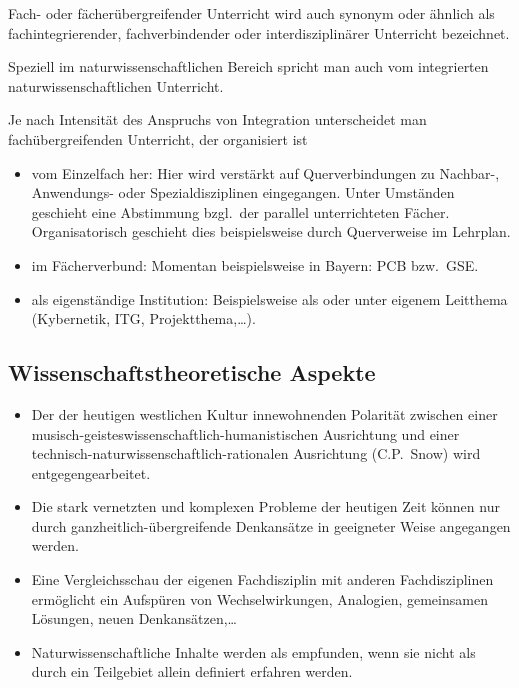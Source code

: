 Fach- oder f\"{a}cher\"{u}bergreifender Unterricht wird auch synonym
oder \"{a}hnlich als fachintegrierender, fachverbindender oder
interdisziplin\"{a}rer Unterricht bezeichnet.

\mip
Speziell im naturwissenschaftlichen Bereich spricht man auch vom
integrierten naturwissenschaftlichen Unterricht.

Je nach Intensit\"{a}t des Anspruchs von Integration unterscheidet man
fach\"{u}bergreifenden Unterricht, der organisiert ist
\begin{itemize}
\setlength{\itemsep}{0mm}
\item
vom Einzelfach her:
Hier wird verst\"{a}rkt auf Querverbindungen zu Nachbar-,
Anwendungs- oder Spezialdisziplinen eingegangen.
Unter Umst\"{a}nden geschieht eine Abstimmung
bzgl.\ der parallel unterrichteten F\"{a}cher.
Organisatorisch geschieht dies beispielsweise durch
Querverweise im Lehrplan.
\item
im F\"{a}cherverbund: Momentan beispielsweise in Bayern: PCB bzw.\ GSE.
\item
als eigenst\"{a}ndige Institution:
Beispielsweise als  oder
unter eigenem Leitthema (Kybernetik, ITG, Projektthema,\dots).
\end{itemize}

\subsection{Wissenschaftstheoretische Aspekte}

\begin{itemize}
\setlength{\itemsep}{0mm}
\item
Der der heutigen westlichen Kultur innewohnenden Polarit\"{a}t
zwischen einer
musisch-geistes\-wis\-sen\-schaft\-lich-humanistischen
Ausrichtung und einer technisch-naturwissenschaftlich-rationalen
Ausrichtung (C.P.\ Snow) wird entgegengearbeitet.
\item
Die stark vernetzten und komplexen Probleme der heutigen Zeit
k\"{o}nnen nur durch ganz\-heit\-lich-\"{u}ber\-grei\-fen\-de
Denkans\"{a}tze in geeigneter Weise angegangen werden.
\item
Eine Vergleichsschau der eigenen Fachdisziplin
mit anderen Fachdisziplinen erm\"{o}glicht ein Aufsp\"{u}ren von
Wechselwirkungen, Analogien, gemeinsamen L\"{o}sungen, neuen
Denkans\"{a}tzen,\dots
\item
Naturwissenschaftliche Inhalte werden als  empfunden, wenn sie nicht als durch
ein Teilgebiet allein definiert erfahren werden.
\end{itemize}

